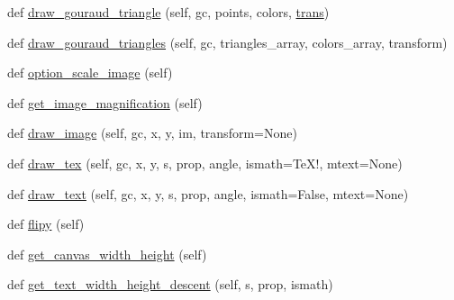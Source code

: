 \begin{DoxyCompactItemize}
\item 
def \hyperlink{classmatplotlib_1_1backends_1_1backend__svg_1_1RendererSVG_a45d5b13dc00b60be9a13f8aaab3d5c11}{draw\+\_\+gouraud\+\_\+triangle} (self, gc, points, colors, \hyperlink{size_2foo_8f90_afabfd8da71309850231a00e53c61f106}{trans})
\item 
def \hyperlink{classmatplotlib_1_1backends_1_1backend__svg_1_1RendererSVG_a1f9d8117ba5e28e9fc2452486b0b0575}{draw\+\_\+gouraud\+\_\+triangles} (self, gc, triangles\+\_\+array, colors\+\_\+array, transform)
\item 
def \hyperlink{classmatplotlib_1_1backends_1_1backend__svg_1_1RendererSVG_a0f36eb56003bcb140c7890a57d55beff}{option\+\_\+scale\+\_\+image} (self)
\item 
def \hyperlink{classmatplotlib_1_1backends_1_1backend__svg_1_1RendererSVG_aeab1ec8e79985bb8533f56895d6ee4de}{get\+\_\+image\+\_\+magnification} (self)
\item 
def \hyperlink{classmatplotlib_1_1backends_1_1backend__svg_1_1RendererSVG_a6ce99ce5077a03a07020f5dbeee55583}{draw\+\_\+image} (self, gc, x, y, im, transform=None)
\item 
def \hyperlink{classmatplotlib_1_1backends_1_1backend__svg_1_1RendererSVG_a61ca03b08857bf804b2cd3a66cf6e5c3}{draw\+\_\+tex} (self, gc, x, y, s, prop, angle, ismath=\textquotesingle{}Te\+X!\textquotesingle{}, mtext=None)
\item 
def \hyperlink{classmatplotlib_1_1backends_1_1backend__svg_1_1RendererSVG_aebd281731dc19a7dc30f96345303c28b}{draw\+\_\+text} (self, gc, x, y, s, prop, angle, ismath=False, mtext=None)
\item 
def \hyperlink{classmatplotlib_1_1backends_1_1backend__svg_1_1RendererSVG_a2b7d2ab77ead13731e09e184248b1c93}{flipy} (self)
\item 
def \hyperlink{classmatplotlib_1_1backends_1_1backend__svg_1_1RendererSVG_acce7bd5300e771075017041b26d76cf8}{get\+\_\+canvas\+\_\+width\+\_\+height} (self)
\item 
def \hyperlink{classmatplotlib_1_1backends_1_1backend__svg_1_1RendererSVG_a603e560b8df15a67e5b7febfc0326c31}{get\+\_\+text\+\_\+width\+\_\+height\+\_\+descent} (self, s, prop, ismath)
\end{DoxyCompactItemize}
